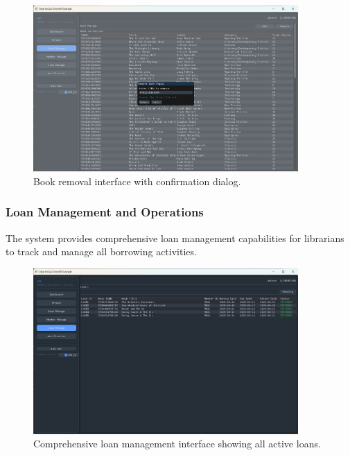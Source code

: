\begin{figure}[H]
	\centering
	\includegraphics[width=0.9\textwidth]{figures/screenshot_librarian_removebook.png}
	\caption{Book removal interface with confirmation dialog.}
	\label{fig:ss_librarian_removebook}
\end{figure}

\subsubsection{Loan Management and Operations}
The system provides comprehensive loan management capabilities for librarians to track and manage all borrowing activities.

\begin{figure}[H]
	\centering
	\includegraphics[width=0.9\textwidth]{figures/screenshot_librarian_loanmanage.png}
	\caption{Comprehensive loan management interface showing all active loans.}
	\label{fig:ss_librarian_loanmanage}
\end{figure}

